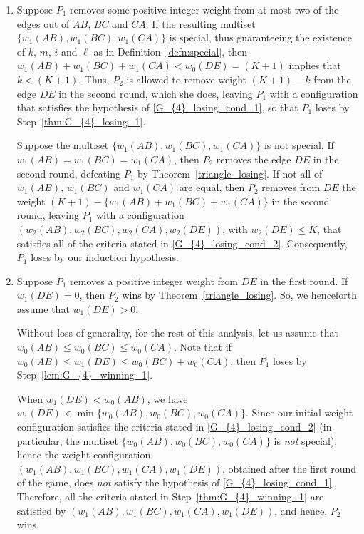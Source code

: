 \documentclass[11pt,reqno]{amsart}
\theoremstyle{definition}
\theoremstyle{definition}
\begin{document}
\begin{enumerate}
\item Suppose $P_{1}$ removes some positive integer weight from at most two of the edges out of $AB$, $BC$ and $CA$. If the resulting multiset $\{w_{1}(AB),w_{1}(BC),w_{1}(CA)\}$ is special, thus guaranteeing the existence of $k$, $m$, $i$ and $\ell$ as in Definition~\ref{defn:special}, then $w_{1}(AB)+w_{1}(BC)+w_{1}(CA)<w_{0}(DE)=(K+1)$ implies that $k<(K+1)$. Thus, $P_{2}$ is allowed to remove weight $(K+1)-k$ from the edge $DE$ in the second round, which she does, leaving $P_{1}$ with a configuration that satisfies the hypothesis of \eqref{G_{4}_losing_cond_1}, so that $P_{1}$ loses by Step~\eqref{thm:G_{4}_losing_1}.

\sloppy Suppose the multiset $\{w_{1}(AB),w_{1}(BC),w_{1}(CA)\}$ is not special. If $w_{1}(AB)=w_{1}(BC)=w_{1}(CA)$, then $P_{2}$ removes the edge $DE$ in the second round, defeating $P_{1}$ by Theorem~\ref{triangle_losing}. If not all of $w_{1}(AB)$, $w_{1}(BC)$ and $w_{1}(CA)$ are equal, then $P_{2}$ removes from $DE$ the weight $(K+1)-\{w_{1}(AB)+w_{1}(BC)+w_{1}(CA)\}$ in the second round, leaving $P_{1}$ with a configuration $(w_{2}(AB),w_{2}(BC),w_{2}(CA),w_{2}(DE))$, with $w_{2}(DE)\leqslant K$, that satisfies all of the criteria stated in \eqref{G_{4}_losing_cond_2}. Consequently, $P_{1}$ loses by our induction hypothesis. 

\item Suppose $P_{1}$ removes a positive integer weight from $DE$ in the first round. If $w_{1}(DE)=0$, then $P_{2}$ wins by Theorem~\ref{triangle_losing}. So, we henceforth assume that $w_{1}(DE)>0$.

Without loss of generality, for the rest of this analysis, let us assume that $w_{0}(AB)\leqslant w_{0}(BC)\leqslant w_{0}(CA)$. Note that if $w_{0}(AB) \leqslant w_{1}(DE) \leqslant w_{0}(BC)+w_{0}(CA)$, then $P_{1}$ loses by Step~\eqref{lem:G_{4}_winning_1}. 

\sloppy When $w_{1}(DE)<w_{0}(AB)$, we have $w_{1}(DE)<\min\{w_{0}(AB),w_{0}(BC),w_{0}(CA)\}$. Since our initial weight configuration satisfies the criteria stated in \eqref{G_{4}_losing_cond_2} (in particular, the multiset $\{w_{0}(AB),w_{0}(BC),w_{0}(CA)\}$ is \emph{not} special), hence the weight configuration $(w_{1}(AB),w_{1}(BC),w_{1}(CA),w_{1}(DE))$, obtained after the first round of the game, does \emph{not} satisfy the hypothesis of \eqref{G_{4}_losing_cond_1}. Therefore, all the criteria stated in Step~\eqref{thm:G_{4}_winning_1} are satisfied by $(w_{1}(AB),w_{1}(BC),w_{1}(CA),w_{1}(DE))$, and hence, $P_{2}$ wins. 


\end{enumerate}
\end{document}
